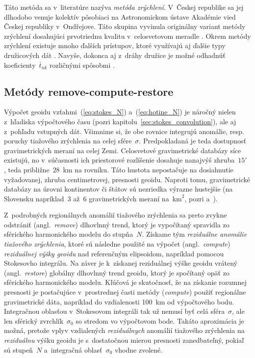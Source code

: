 \documentclass[a4paper, 12pt]{book}
\begin{document}
Táto metóda sa v~literatúre nazýva \emph{metóda zrýchlení}.   V~Českej 
republike sa jej dlhodobo venuje kolektív pôsobiaci na Astronomickom ústave 
Akadémie vied Českej republiky v~Ond\v{r}ejove.  Táto skupina vyvinula 
originálny variant metódy zrýchlení dosahujúci prvotriednu kvalitu 
v~celosvetovom meradle \parencite{Bezdek2014,encarnacao2020}.  Okrem metódy 
zrýchlení existuje mnoho ďalších prístupov, ktoré využívajú aj ďalšie typy 
družicových dát \parencite[pozri][]{SeeberSatelliteGeodesy}.  Navyše, dokonca 
aj z~dráhy družice je možné odhadnúť koeficienty~$\bar{t}_{nk}$ rozličnými 
spôsobmi \parencite[napríklad][]{Baur2014}.


\subsection{Metódy remove-compute-restore}

Výpočet geoidu vzťahmi~(\ref{eq:stokes_N}) a~(\ref{eq:hotine_N}) je náročný 
nielen z~hľadiska výpočtového času (pozri 
kapitolu~\ref{sec:stokes_convolution}), ale aj z~pohľadu vstupných dát.  
Všimnime si, že obe rovnice integrujú anomálie, resp. poruchy tiažového 
zrýchlenia na celej sfére~$\sigma$.  Predpokladaná je teda dostupnosť 
gravimetrických meraní na celej Zemi.  Celosvetové gravimetrické databázy síce 
existujú, no v~súčasnosti ich priestorové rozlíšenie dosahuje nanajvýš 
zhruba~$15'$ \parencite{EGM2008,Pail2018}, teda približne~$28$~km na rovníku.  
Táto hustota nepostačuje na dosiahnutie vyžadovanej, zhruba centimetrovej, 
presnosti geoidu.  Naproti tomu, gravimetrické databázy na úrovni kontinentov 
či štátov sú nezriedka výrazne hustejšie (na Slovensku napríklad~3 až~6 
gravimetrických meraní na~$\textrm{km}^2$, pozri \cite{Kubes2001} 
a~\cite{Zahorec2017}).

Z~podrobných regionálnych anomálií tiažového zrýchlenia sa preto zvykne 
odstrániť (angl.~\emph{remove}) dlhovlnný trend, ktorý je vypočítaný spravidla 
zo sférického harmonického modelu do stupňa~$N$.  Získame tým \emph{reziduálne 
anomálie tiažového zrýchlenia}, ktoré sú následne použité na výpočet 
(angl.~\emph{compute}) \emph{reziduálnej výšky geoidu} nad referenčným 
elipsoidom, napríklad pomocou Stokesovho integrálu.  Na záver je k~získanej 
reziduálnej výške geoidu vrátený (angl.~\emph{restore}) globálny dlhovlnný 
trend geoidu, ktorý je spočítaný opäť zo sférického harmonického modelu.  
Kľúčová je skutočnosť, že na získanie rozumnej presnosti je postačujúce 
v~prostrednej časti metódy (\emph{compute}) použiť regionálne gravimetrické 
dáta, napríklad do vzdialenosti 100~km od výpočtového bodu.  Integračnou 
oblasťou v~Stokesovom integráli tak už nemusí byť celá sféra~$\sigma$, ale len 
sférický zvrchlík~$\sigma_0$ so stredom vo výpočtovom bode.  Takáto aproximácia 
je možná, pretože vplyv vzdialených \emph{reziduálnych} anomálií tiažového 
zrýchlenia na \emph{reziduálnu} výšku geoidu je s~dostatočnou mierou presnosti 
zanedbateľný, pokiaľ sú stupeň~$N$ a~integračná oblasť~$\sigma_0$ vhodne 
zvolené.
\end{document}
